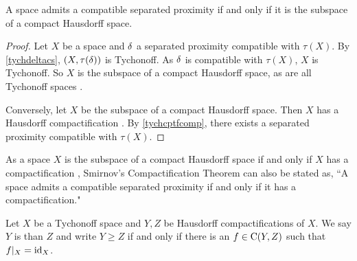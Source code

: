 \begin{theorem}
	\label{compseptych}
	A space admits a compatible separated proximity if and only if it is the subspace of a compact Hausdorff space.
\end{theorem}
\begin{proof}
	Let \( X \) be a space and \( \mathord{\delta} \) a separated proximity compatible with \( \tau(X) \).  By \ref{tychdeltacs}, \( (X,\tau(\mathord{\delta})) \) is Tychonoff.  As \( \mathord{\delta} \) is compatible with \( \tau(X) \), \( X \) is Tychonoff.  So \( X \) is the subspace of a compact Hausdorff space, as are all Tychonoff spaces \cite[XVII.4.7]{maurin}.
	
	Conversely, let \( X \) be the subspace of a compact Hausdorff space.  Then \( X \) has a Hausdorff compactification \cite[XVII.4.7]{maurin}.  By \ref{tychcptfcomp}, there exists a separated proximity compatible with \( \tau(X) \).
\end{proof}

\begin{remark}
	As a space \( X \) is the subspace of a compact Hausdorff space if and only if \( X \) has a compactification \cite[XVII.4.7]{maurin}, Smirnov's Compactification Theorem can also be stated as, ``A space admits a compatible separated proximity if and only if it has a compactification."
\end{remark}

\begin{comment}
The following is not true.  X a subset of a compact Hausdorff Y implies X has a compactification...not necessarily Hausdorff.
\begin{remark}
	As a space \( X \) is Tychonoff if and only if \( X \) is the subspace of a compact Hausdorff space if and only if \( X \) has a Hausdorff compactification \cite[XVII.4.7]{maurin}, Smirnov's Compactification Theorem can also be stated as, ``A space admits a compatible separated proximity if and only if it is Tychonoff." or ``A space admits a compatible separated proximity if and only if it has a Hausdorff compactification."
\end{remark}
\end{comment}

\begin{definition}
	Let \( X \) be a Tychonoff space and \( Y, Z \) be Hausdorff compactifications of \( X \).  We say \( Y \) is  than \( Z \) and write \( Y \geq Z \) if and only if there is an \( f \in \operatorname{C}(Y,Z) \) such that \( f|_X = \operatorname{id}_X \).
\end{definition}

